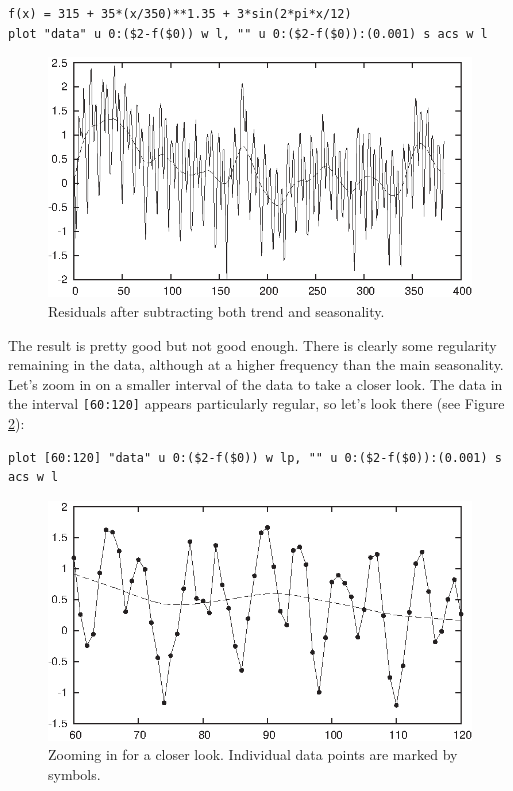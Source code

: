 \begin{verbatim}
f(x) = 315 + 35*(x/350)**1.35 + 3*sin(2*pi*x/12)
plot "data" u 0:($2-f($0)) w l, "" u 0:($2-f($0)):(0.001) s acs w l
\end{verbatim}

\begin{figure}[t!]
  \centerline{\includegraphics{img/session08}}
  \caption{Residuals after subtracting both trend and seasonality.}
  \label{fig:session08}\vspace*{-6pt}
\end{figure}
    
The result is pretty good but not good enough. There is clearly some
regularity remaining in the data, although at a higher frequency than
the main seasonality. Let's zoom in on a smaller interval of the data
to take a closer look. The data in the interval \texttt{[60:120]}
appears particularly regular, so let's look there (see Figure
\ref{fig:session09}):

\begin{verbatim}
plot [60:120] "data" u 0:($2-f($0)) w lp, "" u 0:($2-f($0)):(0.001) s acs w l
\end{verbatim}

\begin{figure}[t!]
  \centerline{\includegraphics{img/session09}}
  \caption{Zooming in for a closer look. Individual data points are
    marked by symbols.}
  \label{fig:session09}
\end{figure}
    
